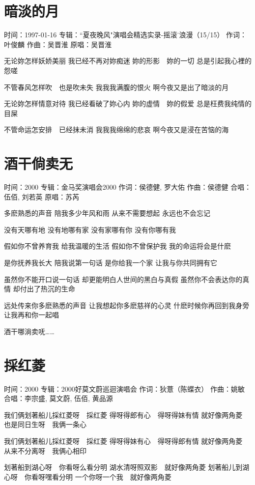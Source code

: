 \documentclass[UTF8,a4paper,oneside,twocolumn,12pt]{ctexbook}
\newcommand{\infopair}[2]{\textbullet #1：#2}
\newcommand{\zc}[1][伍佰]{\infopair{作词}{#1}}
\newcommand{\zq}[1][伍佰]{\infopair{作曲}{#1}}
\newcommand{\zj}[1]{\infopair{专辑}{#1}}
\newcommand{\yc}[1]{\infopair{原唱}{#1}}
\newcommand{\sj}[1]{\infopair{时间}{#1}}
\newenvironment{info}{\begin{flushleft}\kaishu
	}
	{\end{flushleft}\normalsize\yahei\par}
\newenvironment{lyric}{
	}
{}
\begin{document}
\section{暗淡的月}
\begin{info}
	\sj{1997-01-16}
	\zj{``夏夜晚风"演唱会精选实录-摇滚˙浪漫（15/15）}
	\zc[叶俊麟]
	\zq[吴晋淮]
	\yc{吴晋淮}
\end{info}
\begin{lyric}
	无论妳怎样妖娇美丽
	我已经不再对妳痴迷
	妳的形影　妳的一切
	总是引起我心裡的怨嗟

	不管春风怎样吹　也是吹未失
	我我我满腹的恨火
	啊今夜又是出了暗淡的月

	无论妳怎样情意对待
	我已经看破了妳心内
	妳的虚情　妳的假爱
	总是枉费我纯情的目屎

	不管命运怎安排　已经抹未消
	我我我绵绵的悲哀
	啊今夜又是浸在苦恼的海
\end{lyric}

\section{酒干倘卖无}
\begin{info}
	\sj{2000}
	\zj{金马奖演唱会2000}
	\zc[侯德健, 罗大佑]
	\zq[侯德健]
	\infopair{合唱}{伍佰, 刘若英}
	\yc{苏芮}
\end{info}
\begin{lyric}
	多麽熟悉的声音
	陪我多少年风和雨
	从来不需要想起
	永远也不会忘记

	没有天哪有地
	没有地哪有家
	没有家哪有你
	没有你哪有我

	假如你不曾养育我
	给我温暖的生活
	假如你不曾保护我
	我的命运将会是什麽

	是你抚养我长大
	陪我说第一句话
	是你给我一个家
	让我与你共同拥有它

	虽然你不能开口说一句话
	却更能明白人世间的黑白与真假
	虽然你不会表达你的真情
	却付出了热沉的生命

	远处传来你多麽熟悉的声音
	让我想起你多麽慈祥的心灵
	什麽时候你再回到我身旁
	让我再和你一起唱

	酒干哪淌卖呒……
\end{lyric}

\section{採红菱}
\begin{info}
	\sj{2000}
	\zj{2000好莫文蔚巡迴演唱会}
	\zc[狄薏（陈蝶衣）]
	\zq[姚敏]
	\infopair{合唱}{李宗盛, 莫文蔚, 伍佰, 黄品源}
\end{info}
\begin{lyric}
	我们俩划著船儿採红菱呀　採红菱
	得呀得郎有心　得呀得妹有情
	就好像两角菱　也是同日生呀　我俩一条心

	我们俩划著船儿採红菱呀　採红菱
	得呀得妹有心　得呀得郎有情
	就好像两角菱　从来不分离呀　我俩心相印

	划著船到湖心呀　你看呀么看分明
	湖水清呀照双影　就好像两角菱
	划著船儿到湖心呀　你看呀嘿看分明
	一个你呀一个我　就好像两角菱
\end{lyric}
\end{document}
